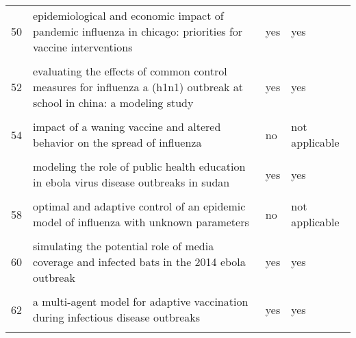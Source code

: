 \documentclass[
]{article}
\begin{document}
\begin{landscape}
\begin{longtable}{l>{\raggedright\arraybackslash}p{9cm}ll}
50 & epidemiological and economic impact of pandemic influenza in chicago: priorities for vaccine interventions & yes & yes\\
\addlinespace
\cellcolor{gray!6}{51} & \cellcolor{gray!6}{estimating direct and indirect protective effect of influenza vaccination in the united states} & \cellcolor{gray!6}{yes} & \cellcolor{gray!6}{yes}\\
52 & evaluating the effects of common control measures for influenza a (h1n1) outbreak at school in china: a modeling study & yes & yes\\
\cellcolor{gray!6}{53} & \cellcolor{gray!6}{evaluation of strategies to control a potential outbreak of foot-and-mouth disease in sweden} & \cellcolor{gray!6}{yes} & \cellcolor{gray!6}{no}\\
54 & impact of a waning vaccine and altered behavior on the spread of influenza & no & not applicable\\
\cellcolor{gray!6}{55} & \cellcolor{gray!6}{mathematical models for devising the optimal ebola virus disease eradication} & \cellcolor{gray!6}{yes} & \cellcolor{gray!6}{yes}\\
\addlinespace
56 & modeling the role of public health education in ebola virus disease outbreaks in sudan & yes & yes\\
\cellcolor{gray!6}{57} & \cellcolor{gray!6}{modelling the transmission and control strategies of varicella among school children in shenzhen, china} & \cellcolor{gray!6}{yes} & \cellcolor{gray!6}{yes}\\
58 & optimal and adaptive control of an epidemic model of influenza with unknown parameters & no & not applicable\\
\cellcolor{gray!6}{59} & \cellcolor{gray!6}{simulating endogenous dynamics of intervention-capacity deployment: ebola outbreak in liberia} & \cellcolor{gray!6}{yes} & \cellcolor{gray!6}{yes}\\
60 & simulating the potential role of media coverage and infected bats in the 2014 ebola outbreak & yes & yes\\
\addlinespace
\cellcolor{gray!6}{61} & \cellcolor{gray!6}{a mathematical model of ebola virus disease: using sensitivity analysis to determine effective intervention targets} & \cellcolor{gray!6}{no} & \cellcolor{gray!6}{not applicable}\\
62 & a multi-agent model for adaptive vaccination during infectious disease outbreaks & yes & yes\\
\cellcolor{gray!6}{63} & \cellcolor{gray!6}{assessing the efficiency of movement restriction as a control strategy of ebola} & \cellcolor{gray!6}{no} & \cellcolor{gray!6}{not applicable}\\

\end{longtable}
\end{landscape}
\end{document}
